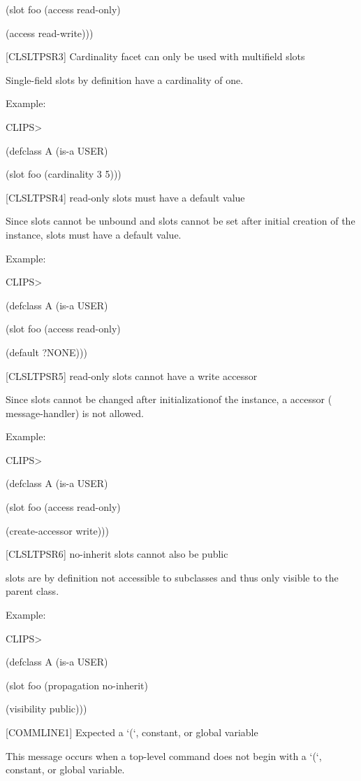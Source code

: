 \documentclass[letterpaper,10pt,english]{sphinxmanual}
\begin{document}
(slot foo (access read-only)

(access read-write)))

{[}CLSLTPSR3{]} Cardinality facet can only be used with multifield slots

Single-field slots by definition have a cardinality of one.

Example:

CLIPS\textgreater{}

(defclass A (is-a USER)

(slot foo (cardinality 3 5)))

{[}CLSLTPSR4{]} read-only slots must have a default value

Since slots cannot be unbound and  slots cannot be set
after initial creation of the instance,  slots must have a
default value.

Example:

CLIPS\textgreater{}

(defclass A (is-a USER)

(slot foo (access read-only)

(default ?NONE)))

{[}CLSLTPSR5{]} read-only slots cannot have a write accessor

Since  slots cannot be changed after initializationof the
instance, a  accessor ( message-handler) is not
allowed.

Example:

CLIPS\textgreater{}

(defclass A (is-a USER)

(slot foo (access read-only)

(create-accessor write)))

{[}CLSLTPSR6{]} no-inherit slots cannot also be public

 slots are by definition not accessible to subclasses and
thus only visible to the parent class.

Example:

CLIPS\textgreater{}

(defclass A (is-a USER)

(slot foo (propagation no-inherit)

(visibility public)))

{[}COMMLINE1{]} Expected a ‘(‘, constant, or global variable

This message occurs when a top-level command does not begin with a ‘(‘,
constant, or global variable.
\end{document}
